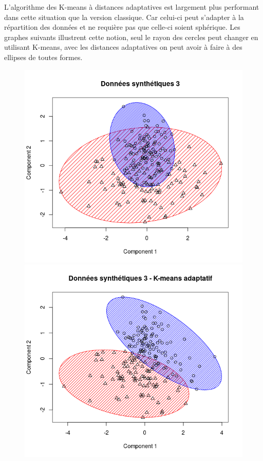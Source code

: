 \documentclass[a4paper, titlepage]{report}
\begin{document}
\pagebreak
L'algorithme des K-means à distances adaptatives est largement plus performant dans cette situation que la version classique. Car celui-ci peut s’adapter à la répartition des données et ne requière pas que celle-ci soient sphérique. Les graphes suivants illustrent cette notion, seul le rayon des cercles peut changer en utilisant K-means, avec les distances adaptatives on peut avoir à faire à des ellipses de toutes formes.

\begin{figure}[h]
	\begin{center}
		\includegraphics[scale = 0.22]{./doc/hclust-synt-3.png}
		\includegraphics[scale = 0.22]{./doc/hclust-synt-3-ka.png}

\end{center}
\end{figure}
\end{document}
